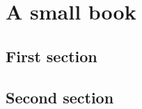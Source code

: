 \documentclass[10pt,a5paper,twoside]{book}
\begin{document}
\chapter{A small book}
\lipsum[1-3]
\section{First section}
\lipsum[4-7]
\section{Second section}
\lipsum[8-12]
\end{document}
